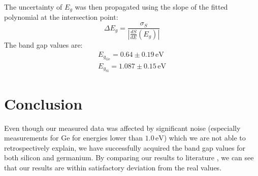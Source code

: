 \documentclass[english,11pt,a4paper]{article}
\begin{document}
\begin{multicols}{2}
		The uncertainty of $E_g$ was then propagated using the slope of the fitted polynomial at the intersection point:
		\[
		\Delta E_g = \frac{\sigma_S}{\left| \frac{dS}{dE}(E_g) \right|}
		\]
		The band gap values are:
		\begin{gather*}
			E_{g_\mathrm{Ge}} = 0.64 \pm 0.19\,\mathrm{eV}\\
			E_{g_\mathrm{Si}} = 1.087 \pm 0.15 \,\mathrm{eV}
		\end{gather*}
	
		\section{Conclusion}
		Even though our measured data was affected by significant noise (especially measurements for Ge for energies lower than $1.0\, \mathrm{eV}$) which we are not able to retrospectively explain, we have successfully acquired the band gap values for both silicon and germanium. By comparing our results to literature \cite{NIST}, we can see that our results are within satisfactory deviation from the real values.
	
		

		

	\printbibliography
		
		
	\end{multicols}
\end{document}

